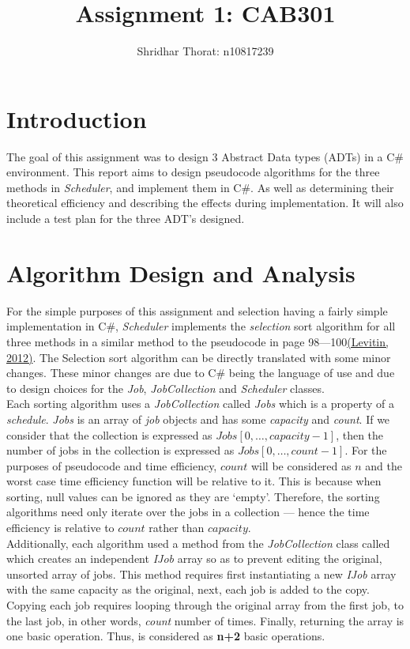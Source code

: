 \documentclass[a4paper]{article}
\begin{document}
\author{Shridhar Thorat: n10817239}
\title{Assignment 1: CAB301}
\maketitle
\tableofcontents
\setcounter{page}{0}

\section{Introduction}
The goal of this assignment was to design 3 Abstract Data types (ADTs) in a C\# environment. This report aims to design pseudocode algorithms for the three methods in \textit{Scheduler}, and implement them in C\#. As well as determining their theoretical efficiency and describing the effects during implementation. It will also include a test plan for the three ADT's designed.
\vspace{-0.5cm}
\section{Algorithm Design and Analysis}
For the simple purposes of this assignment and selection having a fairly simple implementation in C\#, \textit{Scheduler} implements the \textit{selection} sort algorithm for all three methods in a similar method to the pseudocode in page 98---100\hyperlink{section.4}{(Levitin, 2012)}. The Selection sort algorithm can be directly translated with some minor changes. These minor changes are due to C\# being the language of use and due to design choices for the \textit{Job}, \textit{JobCollection} and \textit{Scheduler} classes.
\\[6pt]
Each sorting algorithm uses a \textit{JobCollection} called \textit{Jobs} which is a property of a \textit{schedule}. \textit{Jobs} is an array of \textit{job} objects and has some \textit{capacity} and \textit{count}. If we consider that the collection is expressed as $Jobs[0,\ldots,capacity-1]$, then the number of jobs in the collection is expressed as $Jobs[0,\ldots,count-1]$. For the purposes of pseudocode and time efficiency, $count$ will be considered as $n$ and the worst case time efficiency function will be relative to it. This is because when sorting, null values can be ignored as they are `empty'. Therefore, the sorting algorithms need only iterate over the jobs in a collection --- hence the time efficiency is relative to $count$ rather than $capacity$.
\\[6pt]
Additionally, each algorithm used a method from the \textit{JobCollection} class called  which creates an independent \textit{IJob} array so as to prevent editing the original, unsorted array of jobs. This method requires first instantiating a new \textit{IJob} array with the same capacity as the original, next, each job is added to the copy. Copying each job requires looping through the original array from the first job, to the last job, in other words, \textit{count} number of times. Finally, returning the array is one basic operation. Thus,  is considered as \textbf{n+2} basic operations.
\end{document}
